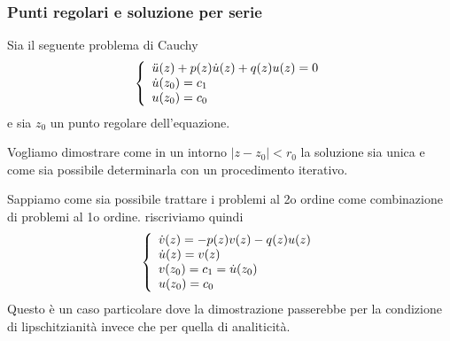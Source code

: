 \newpage

\subsubsection{Punti regolari e soluzione per serie}

Sia il seguente problema di Cauchy
\begin{align}
	\triple{\ddot{u}(z) + p(z) \dot{u}(z) + q(z) u(z) = 0}{\dot{u}(z_0) = c_1 \hfill }{u(z_0) = c_0 \hfill}
\end{align}
e sia $z_0$ un punto regolare dell'equazione. 

Vogliamo dimostrare come in un intorno $|z-z_0| < r_0$ la soluzione sia unica e come sia possibile determinarla con un procedimento iterativo.

Sappiamo come sia possibile trattare i problemi al 2o ordine come combinazione di problemi al 1o ordine. riscriviamo quindi
\begin{align}
	\left\{
	\begin{array}{c}
		\dot{v}(z) = -p(z) v(z) - q(z) u(z) \\
		\dot{u}(z) = v(z) \hfill\\
		v(z_0) = c_1 = \dot{u}(z_0) \hfill\\
		u(z_0) = c_0 \hfill
	\end{array}
	\right.
\end{align}
Questo è un caso particolare dove la dimostrazione passerebbe per la condizione di lipschitzianità invece che per quella di analiticità.

